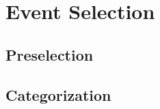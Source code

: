\chapter{Event Selection}\label{cha:event_selection}

\section{Preselection}\label{sec:preselection}

\section{Categorization}\label{sec:categorization}

